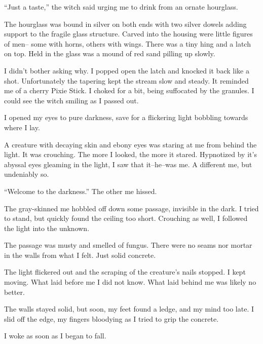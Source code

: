 ``Just a taste,'' the witch said urging me to drink from an ornate hourglass.
\VV


\noindent
The hourglass was bound in silver on both ends with two silver dowels adding support to
the fragile glass structure.  Carved into the housing were little figures of men--
some with horns, others with wings.  There was a tiny hing and a latch on top.
Held in the glass was a mound of red sand pilling up slowly.


I didn't bother asking why.  I popped open the latch and knocked it back like a shot.
Unfortunately the tapering kept the stream slow and steady.
It reminded me of a cherry Pixie Stick.
I choked for a bit, being suffocated by the granules.
I could see the witch smiling as I passed out.


I opened my eyes to pure darkness, save for a flickering light bobbling
towards where I lay.


A creature with decaying skin and ebony eyes was staring at me from behind the light.
It was crouching.  The more I looked, the more it stared.  Hypnotized by it's abyssal
eyes gleaming in the light, I saw that it--he--was me.
A different me, but undeniably so.
\VV


``Welcome to the darkness.''  The other me hissed.
\VV


The gray-skinned me hobbled off down some passage, invisible in the dark.
I tried to stand, but quickly found the ceiling too short.  Crouching as well,
I followed the light into the unknown.


The passage was musty and smelled of fungus.  There were no seams nor mortar in
the walls from what I felt.  Just solid concrete.


The light flickered out and the scraping of the creature's nails stopped.
I kept moving.  What laid before me I did not know.
What laid behind me was likely no better.


The walls stayed solid, but soon, my feet found a ledge, and my mind too late.
I slid off the edge, my fingers bloodying as I tried to grip the concrete.

I woke as soon as I began to fall.
%
%

